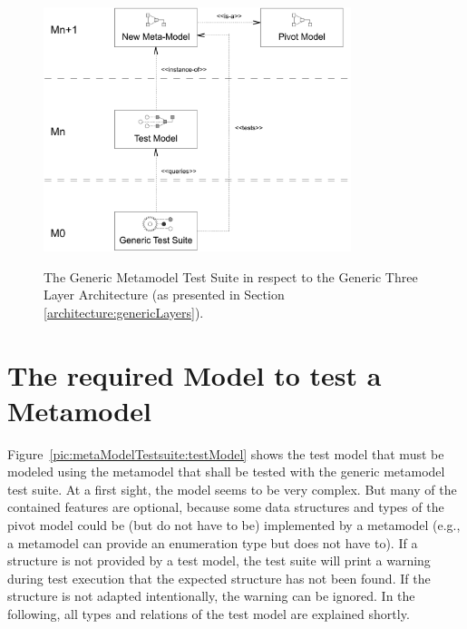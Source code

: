 \begin{figure}[!t]
	\centering
		\includegraphics[width=0.80\textwidth]{figures/metamodeltestsuite/genericTestSuite.pdf}
	\label{pic:metaModelTestsuite:genericTestSuite}
	\caption{The Generic Metamodel Test Suite in respect to the Generic Three Layer Ar\-chi\-tec\-ture (as presented in Section \ref{architecture:genericLayers}).}
\end{figure}



\section{The required Model to test a Metamodel}

Figure~\ref{pic:metaModelTestsuite:testModel} shows the test model that must be
modeled using the metamodel that shall be tested with the generic metamodel 
test suite. At a first sight, the model seems to be very complex. But many of 
the contained features are optional, because some data structures and types of 
the pivot model could be (but do not have to be) implemented by a metamodel 
(e.g., a metamodel can provide an enumeration type but does not have to). If a 
structure is not provided by a test model, the test suite will print a warning 
during test execution that the expected structure has not been found. If the 
structure is not adapted intentionally, the warning can be ignored. In the 
following, all types and relations of the test model are explained shortly.

